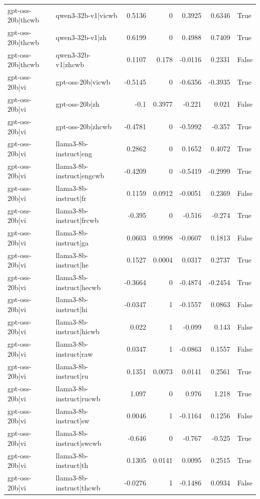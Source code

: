 \begin{table}
\begin{tabular}{l l r r r r l}
gpt-oss-20b|thcwb & qwen3-32b-v1|vicwb & 0.5136 & 0 & 0.3925 & 0.6346 & True \\
gpt-oss-20b|thcwb & qwen3-32b-v1|zh & 0.6199 & 0 & 0.4988 & 0.7409 & True \\
gpt-oss-20b|thcwb & qwen3-32b-v1|zhcwb & 0.1107 & 0.178 & -0.0116 & 0.2331 & False \\
gpt-oss-20b|vi & gpt-oss-20b|vicwb & -0.5145 & 0 & -0.6356 & -0.3935 & True \\
gpt-oss-20b|vi & gpt-oss-20b|zh & -0.1 & 0.3977 & -0.221 & 0.021 & False \\
gpt-oss-20b|vi & gpt-oss-20b|zhcwb & -0.4781 & 0 & -0.5992 & -0.357 & True \\
gpt-oss-20b|vi & llama3-8b-instruct|eng & 0.2862 & 0 & 0.1652 & 0.4072 & True \\
gpt-oss-20b|vi & llama3-8b-instruct|engcwb & -0.4209 & 0 & -0.5419 & -0.2999 & True \\
gpt-oss-20b|vi & llama3-8b-instruct|fr & 0.1159 & 0.0912 & -0.0051 & 0.2369 & False \\
gpt-oss-20b|vi & llama3-8b-instruct|frcwb & -0.395 & 0 & -0.516 & -0.274 & True \\
gpt-oss-20b|vi & llama3-8b-instruct|ga & 0.0603 & 0.9998 & -0.0607 & 0.1813 & False \\
gpt-oss-20b|vi & llama3-8b-instruct|he & 0.1527 & 0.0004 & 0.0317 & 0.2737 & True \\
gpt-oss-20b|vi & llama3-8b-instruct|hecwb & -0.3664 & 0 & -0.4874 & -0.2454 & True \\
gpt-oss-20b|vi & llama3-8b-instruct|hi & -0.0347 & 1 & -0.1557 & 0.0863 & False \\
gpt-oss-20b|vi & llama3-8b-instruct|hicwb & 0.022 & 1 & -0.099 & 0.143 & False \\
gpt-oss-20b|vi & llama3-8b-instruct|raw & 0.0347 & 1 & -0.0863 & 0.1557 & False \\
gpt-oss-20b|vi & llama3-8b-instruct|ru & 0.1351 & 0.0073 & 0.0141 & 0.2561 & True \\
gpt-oss-20b|vi & llama3-8b-instruct|rucwb & 1.097 & 0 & 0.976 & 1.218 & True \\
gpt-oss-20b|vi & llama3-8b-instruct|sw & 0.0046 & 1 & -0.1164 & 0.1256 & False \\
gpt-oss-20b|vi & llama3-8b-instruct|swcwb & -0.646 & 0 & -0.767 & -0.525 & True \\
gpt-oss-20b|vi & llama3-8b-instruct|th & 0.1305 & 0.0141 & 0.0095 & 0.2515 & True \\
gpt-oss-20b|vi & llama3-8b-instruct|thcwb & -0.0276 & 1 & -0.1486 & 0.0934 & False \\

\end{tabular}
\end{table}

